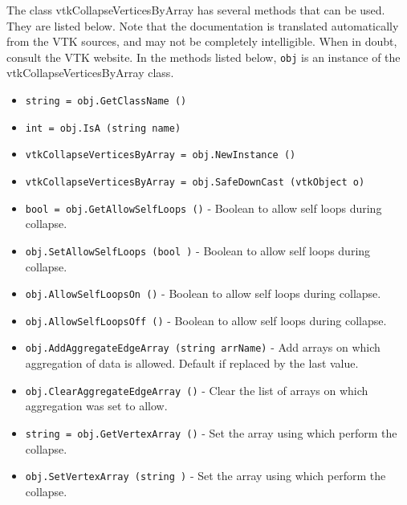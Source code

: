 The class vtkCollapseVerticesByArray has several methods that can be used.
  They are listed below.
Note that the documentation is translated automatically from the VTK sources,
and may not be completely intelligible.  When in doubt, consult the VTK website.
In the methods listed below, \verb|obj| is an instance of the vtkCollapseVerticesByArray class.
\begin{itemize}
\item  \verb|string = obj.GetClassName ()|

\item  \verb|int = obj.IsA (string name)|

\item  \verb|vtkCollapseVerticesByArray = obj.NewInstance ()|

\item  \verb|vtkCollapseVerticesByArray = obj.SafeDownCast (vtkObject o)|

\item  \verb|bool = obj.GetAllowSelfLoops ()| -  Boolean to allow self loops during collapse.

\item  \verb|obj.SetAllowSelfLoops (bool )| -  Boolean to allow self loops during collapse.

\item  \verb|obj.AllowSelfLoopsOn ()| -  Boolean to allow self loops during collapse.

\item  \verb|obj.AllowSelfLoopsOff ()| -  Boolean to allow self loops during collapse.

\item  \verb|obj.AddAggregateEdgeArray (string arrName)| -  Add arrays on which aggregation of data is allowed.
 Default if replaced by the last value.

\item  \verb|obj.ClearAggregateEdgeArray ()| -  Clear the list of arrays on which aggregation was set to allow.

\item  \verb|string = obj.GetVertexArray ()| -  Set the array using which perform the collapse.

\item  \verb|obj.SetVertexArray (string )| -  Set the array using which perform the collapse.

\end{itemize}
